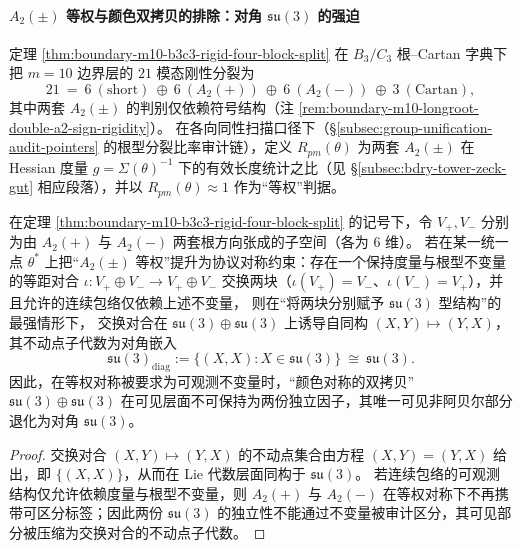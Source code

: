 \paragraph{\texorpdfstring{$A_2(\pm)$}{A2(±)} 等权与颜色双拷贝的排除：对角 \texorpdfstring{$\mathfrak{su}(3)$}{su(3)} 的强迫}\label{par:bdry-a2pm-isotropy-diagonal-su3}
定理 \ref{thm:boundary-m10-b3c3-rigid-four-block-split} 在 \(B_3/C_3\) 根--Cartan 字典下把 \(m=10\) 边界层的 \(21\) 模态刚性分裂为
\[
21\ =\ 6\ (\mathrm{short})\ \oplus\ 6\ (A_2(+))\ \oplus\ 6\ (A_2(-))\ \oplus\ 3\ (\mathrm{Cartan}),
\]
其中两套 \(A_2(\pm)\) 的判别仅依赖符号结构（注 \ref{rem:boundary-m10-longroot-double-a2-sign-rigidity}）。
在各向同性扫描口径下（\S\ref{subsec:group-unification-audit-pointers} 的根型分裂比率审计链），定义 \(R_{pm}(\theta)\) 为两套 \(A_2(\pm)\) 在 Hessian 度量 \(g=\Sigma(\theta)^{-1}\) 下的有效长度统计之比（见 \S\ref{subsec:bdry-tower-zeck-gut} 相应段落），并以 \(R_{pm}(\theta)\approx 1\) 作为“等权”判据。

\begin{proposition}\label{prop:a2pm-isotropy-diagonal-su3}
在定理 \ref{thm:boundary-m10-b3c3-rigid-four-block-split} 的记号下，令
\(
V_{+},V_{-}
\)
分别为由 \(A_2(+)\) 与 \(A_2(-)\) 两套根方向张成的子空间（各为 \(6\) 维）。
若在某一统一点 \(\theta^\ast\) 上把“\texorpdfstring{$A_2(\pm)$}{A2(±)} 等权”提升为协议对称约束：存在一个保持度量与根型不变量的等距对合
\(
\iota:V_{+}\oplus V_{-}\to V_{+}\oplus V_{-}
\)
交换两块（\(\iota(V_{+})=V_{-}\)、\(\iota(V_{-})=V_{+}\)），并且允许的连续包络仅依赖上述不变量，
则在“将两块分别赋予 \(\mathfrak{su}(3)\) 型结构”的最强情形下，
交换对合在
\(
\mathfrak{su}(3)\oplus\mathfrak{su}(3)
\)
上诱导自同构 \((X,Y)\mapsto (Y,X)\)，其不动点子代数为对角嵌入
\[
\mathfrak{su}(3)_{\mathrm{diag}}
:=\{(X,X):X\in\mathfrak{su}(3)\}\ \cong\ \mathfrak{su}(3).
\]
因此，在等权对称被要求为可观测不变量时，“颜色对称的双拷贝”\(\mathfrak{su}(3)\oplus\mathfrak{su}(3)\) 在可见层面不可保持为两份独立因子，其唯一可见非阿贝尔部分退化为对角 \(\mathfrak{su}(3)\)。
\end{proposition}
\begin{proof}
交换对合 \((X,Y)\mapsto(Y,X)\) 的不动点集合由方程 \((X,Y)=(Y,X)\) 给出，即 \(\{(X,X)\}\)，从而在 Lie 代数层面同构于 \(\mathfrak{su}(3)\)。
若连续包络的可观测结构仅允许依赖度量与根型不变量，则 \(A_2(+)\) 与 \(A_2(-)\) 在等权对称下不再携带可区分标签；因此两份 \(\mathfrak{su}(3)\) 的独立性不能通过不变量被审计区分，其可见部分被压缩为交换对合的不动点子代数。
\end{proof}

